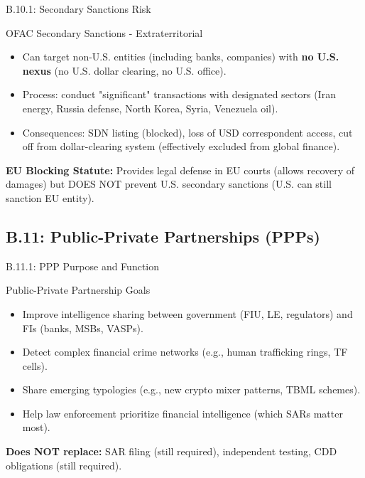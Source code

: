 \documentclass{beamer}
\begin{document}
	\begin{frame}{B.10.1: Secondary Sanctions Risk}
		\begin{block}{OFAC Secondary Sanctions - Extraterritorial}
			\begin{itemize}
				\item Can target non-U.S. entities (including banks, companies) with \textbf{no U.S. nexus} (no U.S. dollar clearing, no U.S. office).
				\item Process: conduct "significant" transactions with designated sectors (Iran energy, Russia defense, North Korea, Syria, Venezuela oil).
				\item Consequences: SDN listing (blocked), loss of USD correspondent access, cut off from dollar-clearing system (effectively excluded from global finance).
			\end{itemize}
		\end{block}
		\textbf{EU Blocking Statute:} Provides legal defense in EU courts (allows recovery of damages) but DOES NOT prevent U.S. secondary sanctions (U.S. can still sanction EU entity).
	\end{frame}
	
	\subsection{B.11: Public-Private Partnerships (PPPs)}
	
	\begin{frame}{B.11.1: PPP Purpose and Function}
		\begin{block}{Public-Private Partnership Goals}
			\begin{itemize}
				\item Improve intelligence sharing between government (FIU, LE, regulators) and FIs (banks, MSBs, VASPs).
				\item Detect complex financial crime networks (e.g., human trafficking rings, TF cells).
				\item Share emerging typologies (e.g., new crypto mixer patterns, TBML schemes).
				\item Help law enforcement prioritize financial intelligence (which SARs matter most).
			\end{itemize}
		\end{block}
		\textbf{Does NOT replace:} SAR filing (still required), independent testing, CDD obligations (still required).
	\end{frame}
	
\end{document}
